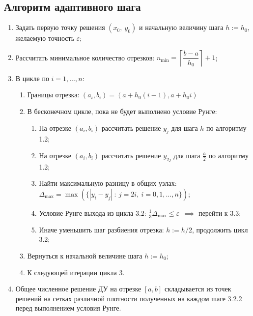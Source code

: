 \subsection{Алгоритм адаптивного шага}

\begin{enumerate}
    \item Задать первую точку решения $(x_0,~y_0)$ и начальную величину шага $h:=h_0$, желаемую точность $\varepsilon$;

    \item Рассчитать минимальное количество отрезков: $n_{\min} = \left\lceil \dfrac{b-a}{h_0} \right\rceil + 1$;


    \item В цикле по $i=1,\ldots,n$:
    \begin{enumerate}
        \item Границы отрезка: $(a_i, b_i) = (a+h_0(i-1), a+h_0i)$
        \item В бесконечном цикле, пока не будет выполнено условие Рунге:
        \begin{enumerate}
            \item На отрезке $(a_i, b_i)$ рассчитать решение $y_{j}$ для шага $h$ по алгоритму 1.2;

            \item На отрезке $(a_i, b_i)$ рассчитать решение $y_{2j}$ для шага $\frac{h}{2}$ по алгоритму 1.2;

            \item Найти максимальную разницу в общих узлах: $\Delta_{\max} = \max(\{|y_i-y_j|~:~j=2i,~i=0,1,\ldots,n\})$;

            \item Условие Рунге выхода из цикла 3.2: $\frac{1}{3} \Delta_{\max} \le \varepsilon ~~ \implies$ перейти к 3.3;

            \item Иначе уменьшить шаг разбиения отрезка: $h:=h/2$, продолжить цикл 3.2;
        \end{enumerate}

        \item Вернуться к начальной величине шага $h:=h_0$;
        \item К следующей итерации цикла 3.
    \end{enumerate}

    \item Общее численное решение ДУ на отрезке $[a,b]$ складывается из точек решений на сетках различной плотности полученных на каждом шаге 3.2.2 перед выполнением условия Рунге.


\end{enumerate}